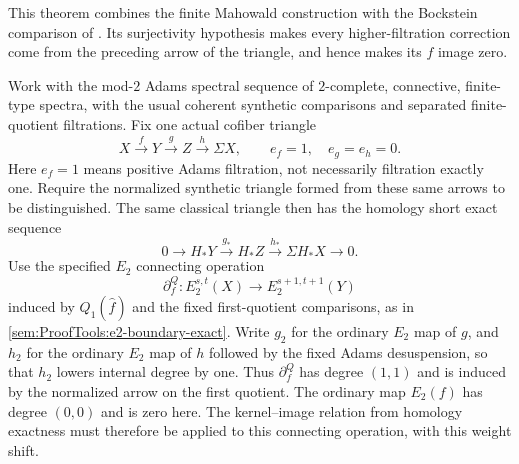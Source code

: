 \begin{theorem}
\label{sem:ProofTools:cprime}
\label{sem:ProofTools:cprime-model}

This theorem combines the finite Mahowald construction with the
Bockstein comparison of \cite[Theorem A.1 and Corollary A.11]{BHS}.
Its surjectivity hypothesis makes every higher-filtration correction
come from the preceding arrow of the triangle, and hence makes its
$f$ image zero.\par
Work with the mod-$2$ Adams spectral sequence of $2$-complete, connective,
finite-type spectra, with the usual coherent synthetic comparisons and
separated finite-quotient filtrations. Fix one actual cofiber triangle
\[
X\xrightarrow fY\xrightarrow gZ\xrightarrow h\Sigma X,
\qquad e_f=1,\quad e_g=e_h=0.
\]
Here $e_f=1$ means positive Adams filtration, not necessarily filtration
exactly one. Require the normalized synthetic triangle formed from
these same arrows to be distinguished. The same classical triangle then has the
homology short exact sequence
\[
0\longrightarrow H_*Y\xrightarrow{g_*}H_*Z
 \xrightarrow{h_*}\Sigma H_*X\longrightarrow0.
\]
Use the specified $E_2$ connecting operation
\[
\partial_f^Q:E_2^{s,t}(X)\longrightarrow E_2^{s+1,t+1}(Y)
\]
induced by $Q_1(\widehat f)$ and the fixed first-quotient comparisons,
as in \ref{sem:ProofTools:e2-boundary-exact}.
Write $g_2$ for the ordinary $E_2$ map of $g$, and $h_2$ for the ordinary
$E_2$ map of $h$ followed by the fixed Adams desuspension, so that
$h_2$ lowers internal degree by one. Thus $\partial_f^Q$ has degree $(1,1)$ and is induced by the
normalized arrow on the first quotient. The ordinary map $E_2(f)$
has degree $(0,0)$ and is zero here. The kernel--image relation from
homology exactness must therefore be applied to this connecting
operation, with this weight shift.


\end{theorem}
